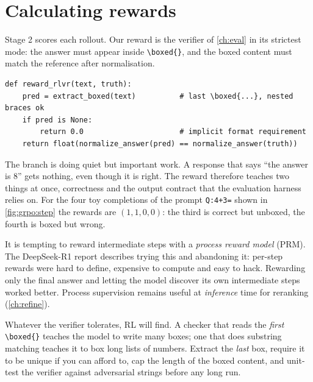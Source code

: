 \section{Calculating rewards}\label{sec:grpo:rewards}

Stage 2 scores each rollout. Our reward is the verifier of \cref{ch:eval} in its strictest
mode: the answer must appear inside \verb|\boxed{}|, and the boxed content must match the
reference after normalisation.

\begin{lstlisting}[caption={The RLVR reward: correct \emph{and} boxed.},label={lst:grpo:reward}]
def reward_rlvr(text, truth):
    pred = extract_boxed(text)          # last \boxed{...}, nested braces ok
    if pred is None:
        return 0.0                      # implicit format requirement
    return float(normalize_answer(pred) == normalize_answer(truth))
\end{lstlisting}

The  branch is doing quiet but important work. A response that says ``the answer
is 8'' gets nothing, even though it is right. The reward therefore teaches two things at
once, correctness and the output contract that the evaluation harness relies on. For the
four toy completions of the prompt \verb|Q:4+3=| shown in \cref{fig:grpo:step} the rewards
are $(1,1,0,0)$: the third is correct but unboxed, the fourth is boxed but wrong.

\begin{keyidea}
It is tempting to reward intermediate steps with a \emph{process reward model} (PRM).
The DeepSeek-R1 report describes trying this and abandoning it: per-step rewards were hard
to define, expensive to compute and easy to hack. Rewarding only the final answer and
letting the model discover its own intermediate steps worked better. Process supervision
remains useful at \emph{inference} time for reranking (\cref{ch:refine}).
\end{keyidea}

\begin{pitfall}
Whatever the verifier tolerates, RL will find. A checker that reads the \emph{first}
\verb|\boxed{}| teaches the model to write many boxes; one that does substring matching
teaches it to box long lists of numbers. Extract the \emph{last} box, require it to be
unique if you can afford to, cap the length of the boxed content, and unit-test the
verifier against adversarial strings before any long run.
\end{pitfall}

